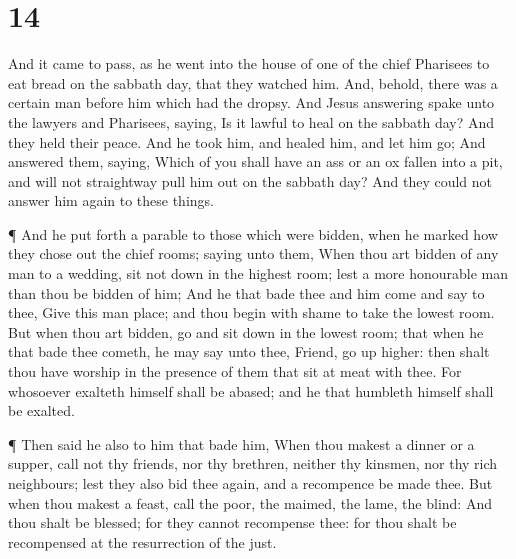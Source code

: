 \hypertarget{section-13}{%
\section{14}\label{section-13}}

 And it came to pass, as he went into the house of one of
the chief Pharisees to eat bread on the sabbath day, that they watched
him.  And, behold, there was a certain man before him which
had the dropsy.  And Jesus answering spake unto the lawyers
and Pharisees, saying, Is it lawful to heal on the sabbath day?
 And they held their peace. And he took him, and healed him,
and let him go;  And answered them, saying, Which of you
shall have an ass or an ox fallen into a pit, and will not straightway
pull him out on the sabbath day?  And they could not answer
him again to these things.

 ¶ And he put forth a parable to those which were bidden,
when he marked how they chose out the chief rooms; saying unto them,
 When thou art bidden of any man to a wedding, sit not down
in the highest room; lest a more honourable man than thou be bidden of
him;  And he that bade thee and him come and say to thee,
Give this man place; and thou begin with shame to take the lowest room.
 But when thou art bidden, go and sit down in the lowest
room; that when he that bade thee cometh, he may say unto thee, Friend,
go up higher: then shalt thou have worship in the presence of them that
sit at meat with thee.  For whosoever exalteth himself
shall be abased; and he that humbleth himself shall be exalted.

 ¶ Then said he also to him that bade him, When thou makest
a dinner or a supper, call not thy friends, nor thy brethren, neither
thy kinsmen, nor thy rich neighbours; lest they also bid thee again, and
a recompence be made thee.  But when thou makest a feast,
call the poor, the maimed, the lame, the blind:  And thou
shalt be blessed; for they cannot recompense thee: for thou shalt be
recompensed at the resurrection of the just.

